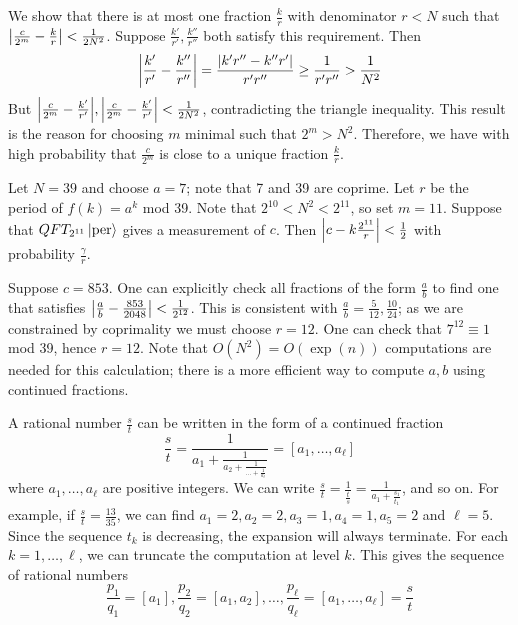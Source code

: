 We show that there is at most one fraction \( \frac{k}{r} \) with denominator \( r < N \) such that \( \abs{\frac{c}{2^m} - \frac{k}{r}} < \frac{1}{2N^2} \).
Suppose \( \frac{k'}{r'}, \frac{k''}{r''} \) both satisfy this requirement.
Then
\[ \abs{\frac{k'}{r'} - \frac{k''}{r''}} = \frac{\abs{k'r'' - k''r'}}{r'r''} \geq \frac{1}{r'r''} > \frac{1}{N^2} \]
But \( \abs{\frac{c}{2^m} - \frac{k'}{r'}}, \abs{\frac{c}{2^m} - \frac{k'}{r'}} < \frac{1}{2N^2} \), contradicting the triangle inequality.
This result is the reason for choosing \( m \) minimal such that \( 2^m > N^2 \).
Therefore, we have with high probability that \( \frac{c}{2^m} \) is close to a unique fraction \( \frac{k}{r} \).
\begin{example}
    Let \( N = 39 \) and choose \( a = 7 \); note that 7 and 39 are coprime.
    Let \( r \) be the period of \( f(k) = a^k \) mod 39.
    Note that \( 2^{10} < N^2 < 2^{11} \), so set \( m = 11 \).
    Suppose that \( QFT_{2^{11}} \ket{\mathrm{per}} \) gives a measurement of \( c \).
    Then \( \abs{c - k \frac{2^{11}}{r}} < \frac{1}{2} \) with probability \( \frac{\gamma}{r} \).

    Suppose \( c = 853 \).
    One can explicitly check all fractions of the form \( \frac{a}{b} \) to find one that satisfies \( \abs{\frac{a}{b} - \frac{853}{2048}} < \frac{1}{2^{12}} \).
    This is consistent with \( \frac{a}{b} = \frac{5}{12}, \frac{10}{24} \); as we are constrained by coprimality we must choose \( r = 12 \).
    One can check that \( 7^{12} \equiv 1 \) mod 39, hence \( r = 12 \).
    Note that \( O(N^2) = O(\exp(n)) \) computations are needed for this calculation; there is a more efficient way to compute \( a, b \) using continued fractions.
\end{example}
A rational number \( \frac{s}{t} \) can be written in the form of a continued fraction
\[ \frac{s}{t} = \frac{1}{a_1 + \frac{1}{a_2 + \frac{1}{\dots + \frac{1}{a_\ell}}}} = [a_1, \dots, a_\ell] \]
where \( a_1, \dots, a_\ell \) are positive integers.
We can write \( \frac{s}{t} = \frac{1}{\frac{t}{s}} = \frac{1}{a_1 + \frac{s_1}{t_1}} \), and so on.
For example, if \( \frac{s}{t} = \frac{13}{35} \), we can find \( a_1 = 2, a_2 = 2, a_3 = 1, a_4 = 1, a_5 = 2 \) and \( \ell = 5 \).
Since the sequence \( t_k \) is decreasing, the expansion will always terminate.
For each \( k = 1, \dots, \ell \), we can truncate the computation at level \( k \).
This gives the sequence of rational numbers
\[ \frac{p_1}{q_1} = [a_1], \frac{p_2}{q_2} = [a_1, a_2], \dots, \frac{p_\ell}{q_\ell} = [a_1, \dots, a_\ell] = \frac{s}{t} \]
